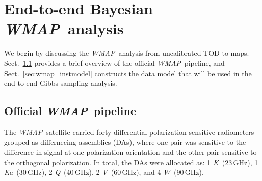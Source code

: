 \documentclass[twocolumn]{../../common/aa}
\def\WMAP{\emph{WMAP}}
\def\WMAPnine{\emph{WMAP9}}
\def\Planck{\emph{Planck}}
\def\commanderthree{\texttt{Commander3}}
\newcommand{\bp}{\textsc{BeyondPlanck}}
\newcommand{\cosmoglobe}{\textsc{Cosmoglobe}}
\newcommand{\K}[0]{\textit K}
\newcommand{\Ka}[0]{\textit{Ka}}
\newcommand{\Q}[0]{\textit Q}
\newcommand{\V}[0]{\textit V}
\newcommand{\W}[0]{\textit W}
\begin{document}
%
%


\section{End-to-end Bayesian \WMAP\ analysis}
\label{sec:methods}

We begin by discussing the \WMAP\ analysis from uncalibrated TOD to maps. Sect.~\ref{sec:official_pipeline} provides a brief overview of the official \WMAP\ pipeline, and Sect.~\ref{sec:wmap_instmodel} constructs the data model that will be used in the end-to-end Gibbs sampling analysis.

\subsection{Official \WMAP\ pipeline}
\label{sec:official_pipeline}

The \WMAP\ satellite carried forty differential polarization-sensitive radiometers grouped as differnecing assemblies (DAs), where one pair was sensitive to the difference in signal at one polarization orientation and the other pair sensitive to the orthogonal polarization. In total, the DAs were allocated as: 1 \K\ (23\,GHz), 1 \Ka\ (30\,GHz), 2 \Q\ (40\,GHz), 2 \V\ (60\,GHz), and 4 \W\ (90\,GHz).
\end{document}

